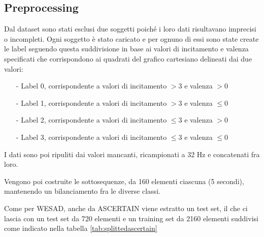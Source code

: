 \subsection{Preprocessing}  %
Dal dataset sono stati esclusi due soggetti poiché i loro dati risultavano imprecisi o incompleti. Ogni soggetto è stato caricato e per ognuno di essi sono state create le label seguendo questa suddivisione in base ai valori di incitamento e valenza specificati che corrispondono ai quadrati del grafico cartesiano delineati dai due valori:
\begin{itemize}
    \item[-] Label 0, corrispondente a valori di incitamento $> 3$ e valenza $> 0$
    \item[-] Label 1, corrispondente a valori di incitamento $> 3$ e valenza $\leq 0$
    \item[-] Label 2, corrispondente a valori di incitamento $\leq 3$ e valenza $> 0$
    \item[-] Label 3, corrispondente a valori di incitamento $\leq 3$ e valenza $\leq 0$
\end{itemize}

I dati sono poi ripuliti dai valori mancanti, ricampionati a 32 Hz e concatenati fra loro.



Vengono poi costruite le sottosequenze, da 160 elementi ciascuna (5 secondi), mantenendo un bilanciamento fra le diverse classi.


Come per WESAD, anche da ASCERTAIN viene estratto un test set, il che ci lascia con un test set da 720 elementi e un training set da 2160 elementi suddivisi come indicato nella tabella \ref{tab:splittedascertain}

